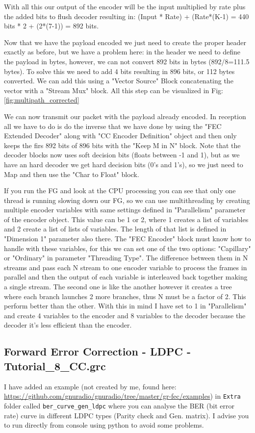 \documentclass[a4paper, 10pt, conference]{ieeeconf}      %
\begin{document}
    With all this our output of the encoder will be the input multiplied by rate plus the added bits to flush decoder resulting in: (Input * Rate) + (Rate*(K-1) = 440 bits * 2 + (2*(7-1)) = 892 bits.
    
    Now that we have the payload encoded we just need to create the proper header exactly as before, but we have a problem here: in the header we need to define the payload in bytes, however, we can not convert 892 bits in bytes (892/8=111.5 bytes). To solve this we need to add 4 bits resulting in 896 bits, or 112 bytes converted. We can add this using a "Vector Source" Block concatenating the vector with a "Stream Mux" block. All this step can be visualized in Fig: \ref{fig:multipath_corrected}
    
    We can now transmit our packet with the payload already encoded. In reception all we have to do is do the inverse that we have done by using the "FEC Extended Decoder" along with "CC Encoder Definition" object and then only keeps the firs 892 bits of 896 bits with the  "Keep M in N" block. Note that the decoder blocks now uses soft decision bits (floats between -1 and 1), but as we have an hard decoder we get hard decision bits (0's and 1's), so we just need to Map and  then use the "Char to Float" block.
    
    If you run the FG and look at the CPU processing you can see that only one thread is running slowing down our FG, so we can use multithreading by creating multiple encoder variables with same settings defined in "Parallelism" parameter of the encoder object. This value can be 1 or 2, where 1 creates a list of variables and 2 create a list of lists of variables. The length of that list is defined in "Dimension 1" parameter also there. The "FEC Encoder" block must know how to handle with these variables, for this we can set one of the two options: "Capillary" or "Ordinary" in parameter "Threading Type". The difference between them in N streams and pass each N stream to one encoder variable to process the frames in parallel and then the output of each variable is interleaved back together making a single stream. The second one is like the another however it creates a tree where each branch launches 2 more branches, thus N must be a factor of 2. This perform better than the other. With this in mind I have set to 1 in "Parallelism" and create 4 variables to the encoder and 8 variables to the decoder because the decoder it's less efficient than the encoder.
    

\subsection{Forward Error Correction - LDPC - Tutorial\_8\_CC.grc}
    I have added an example (not created by me, found here: \url{https://github.com/gnuradio/gnuradio/tree/master/gr-fec/examples}) in \verb|Extra| folder called \verb|ber_curve_gen_ldpc| where you can analyse the BER (bit error rate) curve in different LDPC types (Parity check and Gen. matrix). I advise you to run directly from console using python to avoid some problems.
\end{document}
